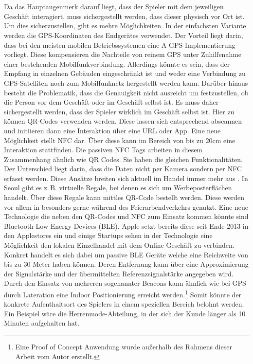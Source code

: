 \\\\
Da das Hauptaugenmerk darauf liegt, dass der Spieler mit dem jeweiligen Geschäft interagiert, muss sichergestellt werden, dass dieser physisch vor Ort ist. 
Um dies sicherzustellen, gibt es mehre Möglichkeiten. In der einfachsten Variante werden die GPS-Koordinaten des Endgerätes verwendet. Der Vorteil liegt darin, dass bei den meisten mobilen Betriebssystemen eine A-GPS Implementierung vorliegt. Diese kompensieren die Nachteile von reinem GPS unter Zuhilfenahme einer bestehenden Mobilfunkverbindung. \cite{Djuknic.2001} Allerdings könnte es sein, dass der Empfang in einzelnen Gebäuden eingeschränkt ist und weder eine Verbindung zu GPS-Satelliten noch zum Mobilfunknetz hergestellt werden kann. Darüber hinaus besteht die Problematik, dass die Genauigkeit nicht ausreicht um festzustellen, ob die Person vor dem Geschäft oder im Geschäft selbst ist.
Es muss daher sichergestellt werden, dass der Spieler wirklich im Geschäft selbst ist.
Hier zu können QR-Codes verwenden werden. Diese lassen sich entsprechend abscannen und initiieren dann eine Interaktion über eine URL oder App. Eine neue Möglichkeit stellt NFC dar.\cite{Rashid.2006b} Über diese kann im Bereich von bis zu 20cm eine Interaktion stattfinden.\cite{Coulton.2006} Die passiven NFC Tags arbeiten in diesem Zusammenhang ähnlich wie QR Codes. Sie haben die gleichen Funktionalitäten. Der Unterschied liegt darin, dass die Daten nicht per Kamera sondern per NFC erfasst werden. Diese Ansätze breiten sich aktuell im Handel immer mehr aus \cite{Heinemann.2014}. In Seoul gibt es z.\,B. virtuelle Regale, bei denen es sich um Werbeposterflächen handelt. Über diese Regale kann mittles QR-Code bestellt werden.\cite{Tesco.2012} Diese werden vor allem in besonders gerne während des Feierarbendverkehrs genutzt.
Eine neue Technologie die neben den QR-Codes und NFC zum Einsatz kommen könnte sind Bluetooth Low Energy Devices (BLE). Apple setzt bereits diese seit Ende 2013 in den Applestores ein und einige Startups sehen in der Technologie eine Möglichkeit den lokalen Einzelhandel mit dem Online Geschäft zu verbinden. Konkret handelt es sich dabei um passive BLE Geräte welche eine Reichweite von bis zu 30 Meter haben können. Deren Entfernung kann über eine Approximierung der Signalstärke und der übermittelten Referenzsignalstärke angegeben wird.\cite{Do.2013} Durch den Einsatz von mehreren sogenannter Beacons kann ähnlich wie bei GPS durch Lateration eine Indoor Positionierung erreicht werden.\footnote{Eine Proof of Concept Anwendung wurde außerhalb des Rahmens dieser Arbeit vom Autor erstellt.} Somit könnte der konkrete Aufenthaltsort des Spielers in einem speziellen Bereich belohnt werden. Ein Beispiel wäre die Herrenmode-Abteilung, in der sich der Kunde länger als 10 Minuten aufgehalten hat.
